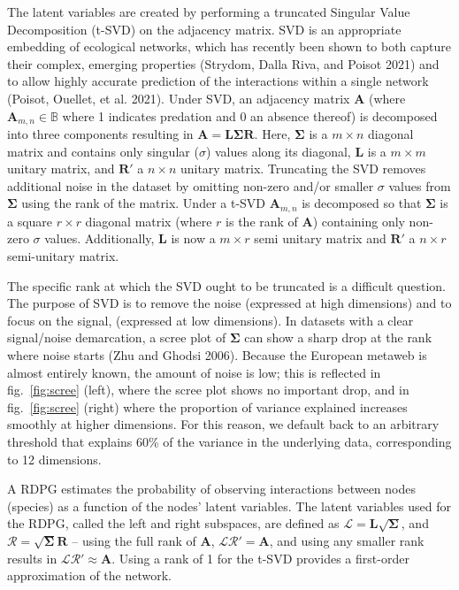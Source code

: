 \documentclass[11pt]{article}
\begin{document}
The latent variables are created by performing a truncated Singular
Value Decomposition (t-SVD) on the adjacency matrix. SVD is an
appropriate embedding of ecological networks, which has recently been
shown to both capture their complex, emerging properties (Strydom, Dalla
Riva, and Poisot 2021) and to allow highly accurate prediction of the
interactions within a single network (Poisot, Ouellet, et al. 2021).
Under SVD, an adjacency matrix \(\mathbf{A}\) (where
\(\mathbf{A}_{m,n}\in\mathbb{B}\) where 1 indicates predation and 0 an
absence thereof) is decomposed into three components resulting in
\(\mathbf{A} = \mathbf{L}\mathbf{\Sigma}\mathbf{R}.\) Here,
\(\mathbf{\Sigma}\) is a \(m \times n\) diagonal matrix and contains
only singular (\(\sigma\)) values along its diagonal, \(\mathbf{L}\) is
a \(m \times m\) unitary matrix, and \(\mathbf{R}'\) a \(n \times n\)
unitary matrix. Truncating the SVD removes additional noise in the
dataset by omitting non-zero and/or smaller \(\sigma\) values from
\(\mathbf{\Sigma}\) using the rank of the matrix. Under a t-SVD
\(\mathbf{A}_{m,n}\) is decomposed so that \(\mathbf{\Sigma}\) is a
square \(r \times r\) diagonal matrix (where \(r\) is the rank of
\(\mathbf{A}\)) containing only non-zero \(\sigma\) values.
Additionally, \(\mathbf{L}\) is now a \(m \times r\) semi unitary matrix
and \(\mathbf{R}'\) a \(n \times r\) semi-unitary matrix.

The specific rank at which the SVD ought to be truncated is a difficult
question. The purpose of SVD is to remove the noise (expressed at high
dimensions) and to focus on the signal, (expressed at low dimensions).
In datasets with a clear signal/noise demarcation, a scree plot of
\(\mathbf{\Sigma}\) can show a sharp drop at the rank where noise starts
(Zhu and Ghodsi 2006). Because the European metaweb is almost entirely
known, the amount of noise is low; this is reflected in
fig.~\ref{fig:scree} (left), where the scree plot shows no important
drop, and in fig.~\ref{fig:scree} (right) where the proportion of
variance explained increases smoothly at higher dimensions. For this
reason, we default back to an arbitrary threshold that explains 60\% of
the variance in the underlying data, corresponding to 12 dimensions.

A RDPG estimates the probability of observing interactions between nodes
(species) as a function of the nodes' latent variables. The latent
variables used for the RDPG, called the left and right subspaces, are
defined as \(\mathcal{L} = \mathbf{L}\sqrt{\mathbf{\Sigma}}\), and
\(\mathcal{R} = \sqrt{\mathbf{\Sigma}}\mathbf{R}\) -- using the full
rank of \(\mathbf{A}\), \(\mathcal{L}\mathcal{R}' = \mathbf{A}\), and
using any smaller rank results in
\(\mathcal{L}\mathcal{R}' \approx \mathbf{A}\). Using a rank of 1 for
the t-SVD provides a first-order approximation of the network.
\end{document}
